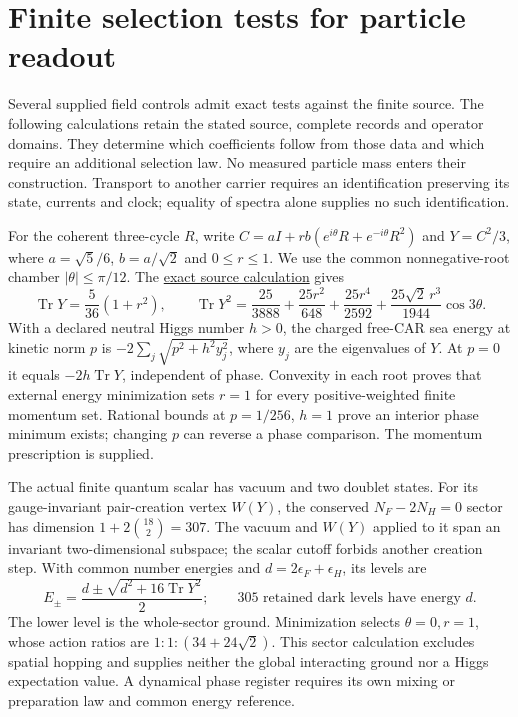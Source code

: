 \section{Finite selection tests for particle readout}
\label{sec:finite-particle-selection-tests}

Several supplied field controls admit exact tests against the finite source.
The following calculations retain the stated source, complete records and
operator domains. They determine which coefficients follow from those data
and which require an additional selection law. No measured particle mass
enters their construction. Transport to another carrier requires an
identification preserving its state, currents and clock; equality of
spectra alone supplies no such identification.

For the coherent three-cycle $R$, write
$C=aI+rb(e^{i\theta}R+e^{-i\theta}R^2)$ and $Y=C^2/3$, where
$a=\sqrt5/6$, $b=a/\sqrt2$ and $0\le r\le1$.
We use the common nonnegative-root chamber $|\theta|\le\pi/12$.
The \href{https://github.com/FloatingPragma/observer-patch-holography/blob/main/model/particle_calibration_selection/PROOF_PHASE_ATTENUATION.md}{exact source calculation}
gives
\[
 \operatorname{Tr}Y=\frac5{36}(1+r^2),\qquad
 \operatorname{Tr}Y^2=\frac{25}{3888}+\frac{25r^2}{648}
 +\frac{25r^4}{2592}+\frac{25\sqrt2\,r^3}{1944}\cos3\theta.
\]
With a declared neutral Higgs number $h>0$, the charged free-CAR sea energy
at kinetic norm $p$ is $-2\sum_j\sqrt{p^2+h^2y_j^2}$, where $y_j$ are the
eigenvalues of $Y$. At $p=0$ it equals $-2h\operatorname{Tr}Y$, independent
of phase. Convexity in each root proves that external energy minimization
sets $r=1$ for every positive-weighted finite momentum set. Rational bounds
at $p=1/256$, $h=1$ prove an interior phase minimum exists; changing $p$
can reverse a phase comparison. The momentum prescription is supplied.

The actual finite quantum scalar has vacuum and two doublet states.
For its gauge-invariant pair-creation vertex $W(Y)$, the conserved
$N_F-2N_H=0$ sector has dimension $1+2\binom{18}{2}=307$.
The vacuum and $W(Y)$ applied to it span an invariant two-dimensional
subspace; the scalar cutoff forbids another creation step.
With common number energies and $d=2\epsilon_F+\epsilon_H$, its levels are
\[
 E_\pm=\frac{d\pm\sqrt{d^2+16\operatorname{Tr}Y^2}}2;
 \qquad 305\text{ retained dark levels have energy }d.
\]
The lower level is the whole-sector ground. Minimization selects
$\theta=0,r=1$, whose action ratios are $1:1:(34+24\sqrt2)$.
This sector calculation excludes spatial hopping and supplies neither the
global interacting ground nor a Higgs expectation value. A dynamical
phase register requires its own mixing or preparation law and common
energy reference.

